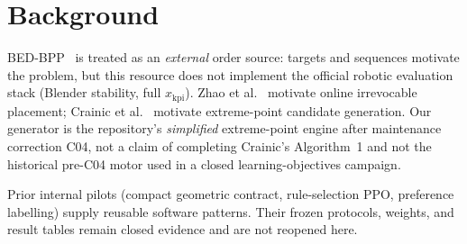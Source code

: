 \section{Background}

BED-BPP~\citep{kagerer2023bedbpp} is treated as an \emph{external} order source:
targets and sequences motivate the problem, but this resource does not implement
the official robotic evaluation stack (Blender stability, full \(x_{\mathrm{kpi}}\)).
Zhao et al.~\citep{zhao2022pct} motivate online irrevocable placement; Crainic et
al.~\citep{crainic2008extreme} motivate extreme-point candidate generation.
Our generator is the repository's \emph{simplified} extreme-point engine after
maintenance correction C04, not a claim of completing Crainic's Algorithm~1 and
not the historical pre-C04 motor used in a closed learning-objectives campaign.

Prior internal pilots (compact geometric contract, rule-selection PPO, preference
labelling) supply reusable software patterns. Their frozen protocols, weights, and
result tables remain closed evidence and are not reopened here.
